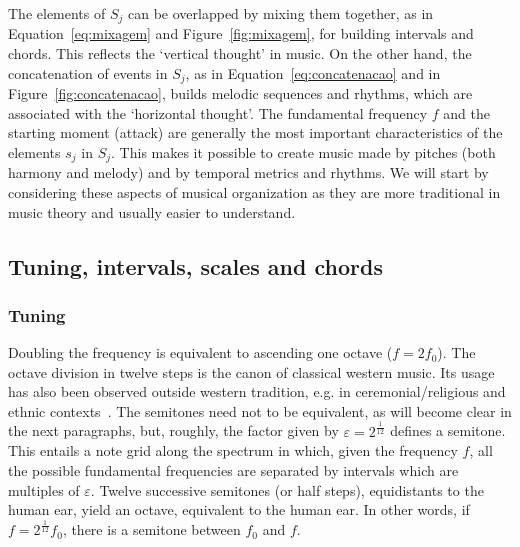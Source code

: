 The elements of $S_j$ can be overlapped by mixing them together, as in
Equation~\ref{eq:mixagem} and Figure~\ref{fig:mixagem}, for building intervals and chords. This reflects the `vertical thought' in music. On the other hand, the concatenation of events
in $S_j$, as in Equation~\ref{eq:concatenacao} and in Figure~\ref{fig:concatenacao}, builds melodic sequences and rhythms, which are associated with the `horizontal thought'. The fundamental frequency $f$ and the starting moment
(attack) are generally the most important characteristics of the elements $s_j$ in $S_j$. This makes it possible to create music made by pitches (both harmony and melody) and by temporal metrics and rhythms.
We will start by considering these aspects of musical organization as they are more traditional in music theory and usually easier to understand.

\subsection{Tuning, intervals, scales and chords}\label{subsec:afinacao}
\subsubsection{Tuning}
Doubling the frequency is equivalent to ascending one octave ($f=2f_0$). The octave division in twelve steps is the canon of classical western music. Its usage has also been observed
outside western tradition, e.g. in ceremonial/religious and ethnic contexts~\cite{Wisnick}. The semitones need not to be equivalent, as will become clear in the next paragraphs, but, roughly, the factor given by $\varepsilon=2^{\frac{1}{12}}$ defines a semitone. This entails a note grid along the spectrum in which, given the frequency $f$, all the possible fundamental frequencies are separated by intervals which are multiples of $\varepsilon$. Twelve successive semitones (or half steps), equidistants to the human ear, yield an
octave, equivalent to the human ear. In other words, if $f=2^{\frac{1}{12}}f_0$, there is a semitone between
$f_0$ and $f$.

